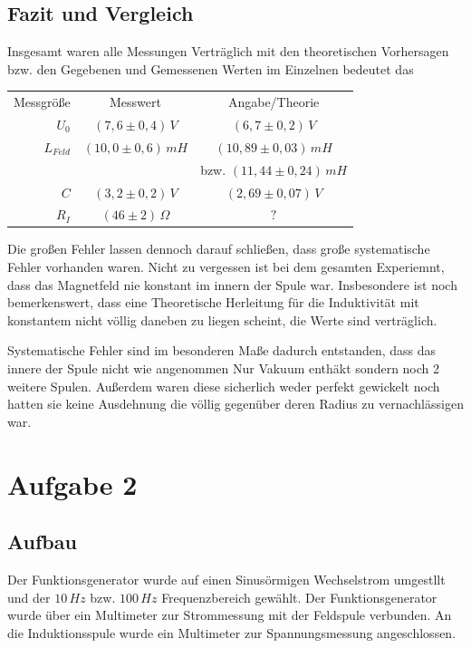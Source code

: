 \documentclass{article}
\begin{document}
\subsection{Fazit und Vergleich}
Insgesamt waren alle Messungen Verträglich mit den theoretischen Vorhersagen bzw. den Gegebenen und Gemessenen Werten im Einzelnen bedeutet das
\vspace{0.2cm}
\begin{center}
\begin{tabular}{r c c} 
  Messgröße & Messwert & Angabe/Theorie \\
  \(U_0\) & \( (7,6 \pm 0,4)\, V \) & \( (6,7 \pm 0,2)\, V \) \\
  \(L_{Feld}\) & \( (10,0 \pm 0,6)\, mH \) & \( (10,89 \pm 0,03)\, mH \)  \\
  & & bzw. \( (11,44 \pm 0,24)\, mH\) \\
  \(C\) & \( (3,2 \pm 0,2)\, V \) & \( (2,69 \pm 0,07)\, V \) \\
  \(R_I\) & \( (46 \pm 2)\, \Omega \) & \( ? \) \\
 \end{tabular}
\end{center}
\vspace{0.2cm}
Die großen Fehler lassen dennoch darauf schließen, dass große systematische Fehler vorhanden waren.   Nicht zu vergessen ist bei dem gesamten Experiemnt, dass das Magnetfeld nie konstant im innern der Spule war. Insbesondere ist noch bemerkenswert, dass eine Theoretische Herleitung für die Induktivität mit konstantem nicht völlig daneben zu liegen scheint, die Werte sind verträglich.

Systematische Fehler sind im besonderen Maße dadurch entstanden, dass das innere der Spule nicht wie angenommen Nur Vakuum enthäkt sondern noch 2 weitere Spulen. Außerdem waren diese sicherlich weder perfekt gewickelt noch hatten sie keine Ausdehnung die völlig gegenüber deren Radius zu vernachlässigen war.

\section{Aufgabe 2}
\subsection{Aufbau}
Der Funktionsgenerator wurde auf einen Sinusörmigen Wechselstrom umgestllt und der \(10 \, Hz \) bzw. \(100 \, Hz \) Frequenzbereich gewählt. Der Funktionsgenerator wurde über ein Multimeter zur Strommessung mit der Feldspule verbunden. An die Induktionsspule wurde ein Multimeter zur Spannungsmessung angeschlossen.
\end{document}
